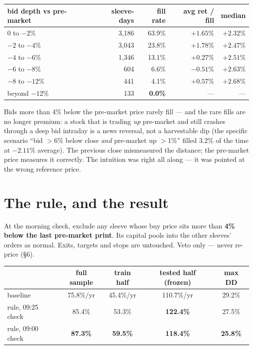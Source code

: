 \documentclass[11pt,a4paper]{article}
\newcommand{\good}[1]{{\color{bcteal}\textbf{#1}}}
\newcommand{\bad}[1]{{\color{bcred}\textbf{#1}}}
\begin{document}
\begin{center}
\begin{tabular}{lrrrr}
\toprule
bid depth vs pre-market & sleeve-days & fill rate & avg ret / fill & median \\
\midrule
0 to $-2\%$      & 3{,}186 & 63.9\% & $+1.65\%$ & $+2.32\%$ \\
$-2$ to $-4\%$   & 3{,}043 & 23.8\% & $+1.78\%$ & $+2.47\%$ \\
$-4$ to $-6\%$   & 1{,}346 & 13.1\% & $+0.27\%$ & $+2.51\%$ \\
$-6$ to $-8\%$   & 604     & 6.6\%  & \bad{$-0.51\%$} & $+2.63\%$ \\
$-8$ to $-12\%$  & 441     & 4.1\%  & $+0.57\%$ & $+2.68\%$ \\
beyond $-12\%$   & 133     & \bad{0.0\%} & --- & --- \\
\bottomrule
\end{tabular}
\end{center}

Bids more than 4\% below the pre-market price rarely fill --- and the rare
fills are no longer premium: a stock that is trading \emph{up} pre-market and
still crashes through a deep bid intraday is a news reversal, not a
harvestable dip (the specific scenario ``bid $>$6\% below close \emph{and}
pre-market up $>$1\%'' filled 3.2\% of the time at $-2.11\%$ average). The
previous close mismeasured the distance; the pre-market price measures it
correctly. The intuition was right all along --- it was pointed at the wrong
reference price.

\section{The rule, and the result}

\begin{tcolorbox}[colback=bcteal!6, colframe=bcteal, boxrule=0.8pt,
  title={\bfseries The pre-market rule}, coltitle=white]
At the morning check, exclude any sleeve whose buy price sits more than
\textbf{4\% below the last pre-market print}. Its capital pools into the other
sleeves' orders as normal. Exits, targets and stops are untouched. Veto only
--- never re-price (\S6).
\end{tcolorbox}

\begin{center}
\begin{tabular}{lcccc}
\toprule
 & full sample & train half & \textbf{tested half (frozen)} & max DD \\
\midrule
baseline            & 75.8\%/yr & 45.4\%/yr & 110.7\%/yr & 29.2\% \\
rule, 09:25 check   & 85.4\% & 53.3\% & \good{122.4\%} & 27.5\% \\
rule, 09:00 check   & \good{87.3\%} & \good{59.5\%} & \good{118.4\%} & \good{25.8\%} \\
\bottomrule
\end{tabular}
\end{center}
\end{document}

